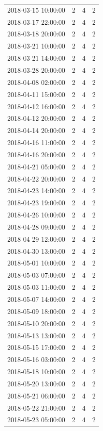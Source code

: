 \begin{tabular}{lrrr}
2018-03-15 10:00:00 & 2 & 4 & 2 \\
2018-03-17 22:00:00 & 2 & 4 & 2 \\
2018-03-18 20:00:00 & 2 & 4 & 2 \\
2018-03-21 10:00:00 & 2 & 4 & 2 \\
2018-03-21 14:00:00 & 2 & 4 & 2 \\
2018-03-28 20:00:00 & 2 & 4 & 2 \\
2018-04-08 02:00:00 & 2 & 4 & 2 \\
2018-04-11 15:00:00 & 2 & 4 & 2 \\
2018-04-12 16:00:00 & 2 & 4 & 2 \\
2018-04-12 20:00:00 & 2 & 4 & 2 \\
2018-04-14 20:00:00 & 2 & 4 & 2 \\
2018-04-16 11:00:00 & 2 & 4 & 2 \\
2018-04-16 20:00:00 & 2 & 4 & 2 \\
2018-04-21 05:00:00 & 2 & 4 & 2 \\
2018-04-22 20:00:00 & 2 & 4 & 2 \\
2018-04-23 14:00:00 & 2 & 4 & 2 \\
2018-04-23 19:00:00 & 2 & 4 & 2 \\
2018-04-26 10:00:00 & 2 & 4 & 2 \\
2018-04-28 09:00:00 & 2 & 4 & 2 \\
2018-04-29 12:00:00 & 2 & 4 & 2 \\
2018-04-30 13:00:00 & 2 & 4 & 2 \\
2018-05-01 10:00:00 & 2 & 4 & 2 \\
2018-05-03 07:00:00 & 2 & 4 & 2 \\
2018-05-03 11:00:00 & 2 & 4 & 2 \\
2018-05-07 14:00:00 & 2 & 4 & 2 \\
2018-05-09 18:00:00 & 2 & 4 & 2 \\
2018-05-10 20:00:00 & 2 & 4 & 2 \\
2018-05-13 13:00:00 & 2 & 4 & 2 \\
2018-05-15 17:00:00 & 2 & 4 & 2 \\
2018-05-16 03:00:00 & 2 & 4 & 2 \\
2018-05-18 10:00:00 & 2 & 4 & 2 \\
2018-05-20 13:00:00 & 2 & 4 & 2 \\
2018-05-21 06:00:00 & 2 & 4 & 2 \\
2018-05-22 21:00:00 & 2 & 4 & 2 \\
2018-05-23 05:00:00 & 2 & 4 & 2 \\

\end{tabular}

